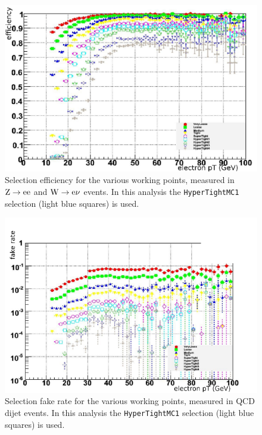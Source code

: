 \begin{figure}[htb]
    \centering
    \includegraphics[width=\textwidth]{images/pdf/hyper_tight_efficiency}
    \caption{Selection efficiency for the various working points, measured
    in $\mathrm{Z} \rightarrow \mathrm{e} \mathrm{e}$ and $\mathrm{W} \rightarrow \mathrm{e} \nu$ events. In this
    analysis the \texttt{HyperTightMC1} selection (light blue squares) is used.}
    \label{fig:hyper_tight_efficiency}
\end{figure}
\begin{figure}[htb]
    \centering
    \includegraphics[width=\textwidth]{images/pdf/hyper_tight_fake_rate}
    \caption{Selection fake rate for the various working points, measured
    in QCD dijet events. In this
    analysis the \texttt{HyperTightMC1} selection (light blue squares) is used.}
    \label{fig:hyper_tight_fake_rate}
\end{figure}


